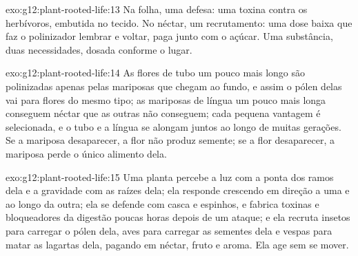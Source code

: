 \begin{solution}{exo:g12:plant-rooted-life:13}
Na folha, uma defesa: uma toxina contra os herbívoros, embutida no
tecido. No néctar, um recrutamento: uma dose baixa que faz o
polinizador lembrar e voltar, paga junto com o açúcar. Uma substância,
duas necessidades, dosada conforme o lugar.
\end{solution}

\begin{solution}{exo:g12:plant-rooted-life:14}
As flores de tubo um pouco mais longo são polinizadas apenas pelas
mariposas que chegam ao fundo, e assim o pólen delas vai para flores do
mesmo tipo; as mariposas de língua um pouco mais longa conseguem néctar
que as outras não conseguem; cada pequena vantagem é selecionada, e o
tubo e a língua se alongam juntos ao longo de muitas gerações. Se a
mariposa desaparecer, a flor não produz semente; se a flor desaparecer,
a mariposa perde o único alimento dela.
\end{solution}

\begin{solution}{exo:g12:plant-rooted-life:15}
Uma planta percebe a luz com a ponta dos ramos dela e a gravidade com
as raízes dela; ela responde crescendo em direção a uma e ao longo da
outra; ela se defende com casca e espinhos, e fabrica toxinas e
bloqueadores da digestão poucas horas depois de um ataque; e ela
recruta insetos para carregar o pólen dela, aves para carregar as
sementes dela e vespas para matar as lagartas dela, pagando em néctar,
fruto e aroma. Ela age sem se mover.
\end{solution}

